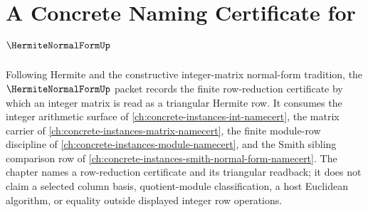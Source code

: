 \chapter{A Concrete Naming Certificate for $\HermiteNormalFormUp$}
\label{ch:concrete-instances-hermite-normal-form-namecert}

Following Hermite and the constructive integer-matrix normal-form tradition, the $\HermiteNormalFormUp$ packet records the finite row-reduction certificate by which an integer matrix is read as a triangular Hermite row. It consumes the integer arithmetic surface of \autoref{ch:concrete-instances-int-namecert}, the matrix carrier of \autoref{ch:concrete-instances-matrix-namecert}, the finite module-row discipline of \autoref{ch:concrete-instances-module-namecert}, and the Smith sibling comparison row of \autoref{ch:concrete-instances-smith-normal-form-namecert}. The chapter names a row-reduction certificate and its triangular readback; it does not claim a selected column basis, quotient-module classification, a host Euclidean algorithm, or equality outside displayed integer row operations.

